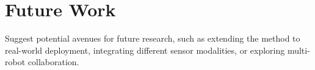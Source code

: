 \section{Future Work}

\begin{outline}
  Suggest potential avenues for future research, such as extending the method to real-world deployment, integrating different sensor modalities, or exploring multi-robot collaboration.
\end{outline}
